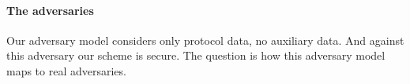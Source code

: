 


%
%
%

\paragraph*{The adversaries}

Our adversary model considers only protocol data, no auxiliary data.
And against this adversary our scheme is secure.
The question is how this adversary model maps to real adversaries.

